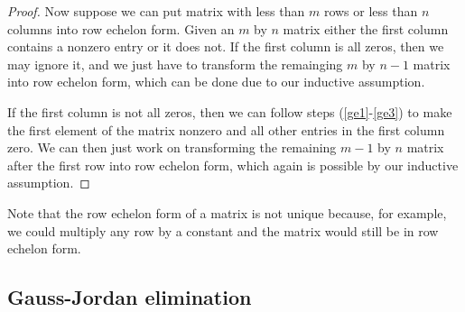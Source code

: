 \documentclass[12pt,reqno]{amsart}
\theoremstyle{definition}
\begin{document}
\begin{proof}
  Now suppose we can put matrix with less than $m$ rows or less than
  $n$ columns into row echelon form. Given an $m$ by $n$ matrix either
  the first column contains a nonzero entry or it does not. If the
  first column is all zeros, then we may ignore it, and we just have
  to transform the remainging $m$ by $n-1$ matrix into row echelon
  form, which can be done due to our inductive assumption. 
  
  If the first column is not all zeros, then we can follow steps
  (\ref{ge1}-\ref{ge3}) to make the first element of the matrix
  nonzero and all other entries in the first column zero. We can then
  just work on transforming the remaining $m-1$ by $n$ matrix after
  the first row into row echelon form, which again is possible by our
  inductive assumption.
\end{proof}
Note that the row echelon form of a matrix is not unique because, for
example, we could multiply any row by a constant and the matrix would
still be in row echelon form. 

\subsection{Gauss-Jordan elimination}
\end{document}
